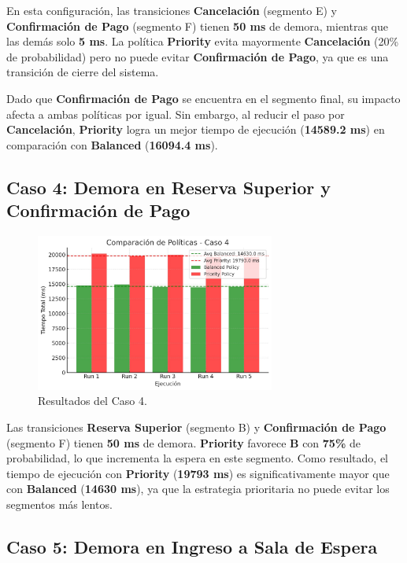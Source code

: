 \documentclass[12pt]{article}
\begin{document}
En esta configuración, las transiciones \textbf{Cancelación} (segmento E) y \textbf{Confirmación de Pago} (segmento F) tienen \textbf{50 ms} de demora, mientras que las demás solo \textbf{5 ms}. La política \textbf{Priority} evita mayormente \textbf{Cancelación} (20\% de probabilidad) pero no puede evitar \textbf{Confirmación de Pago}, ya que es una transición de cierre del sistema.

Dado que \textbf{Confirmación de Pago} se encuentra en el segmento final, su impacto afecta a ambas políticas por igual. Sin embargo, al reducir el paso por \textbf{Cancelación}, \textbf{Priority} logra un mejor tiempo de ejecución (\textbf{14589.2 ms}) en comparación con \textbf{Balanced} (\textbf{16094.4 ms}).

\subsection{Caso 4: Demora en Reserva Superior y Confirmación de Pago}

\begin{figure}[H]
    \centering
    \includegraphics[width=0.7\textwidth]{CASO_4.jpeg}
    \caption{Resultados del Caso 4.}
\end{figure}

Las transiciones \textbf{Reserva Superior} (segmento B) y \textbf{Confirmación de Pago} (segmento F) tienen \textbf{50 ms} de demora. \textbf{Priority} favorece \textbf{B} con \textbf{75\%} de probabilidad, lo que incrementa la espera en este segmento. Como resultado, el tiempo de ejecución con \textbf{Priority} (\textbf{19793 ms}) es significativamente mayor que con \textbf{Balanced} (\textbf{14630 ms}), ya que la estrategia prioritaria no puede evitar los segmentos más lentos.

\subsection{Caso 5: Demora en Ingreso a Sala de Espera}
\end{document}
